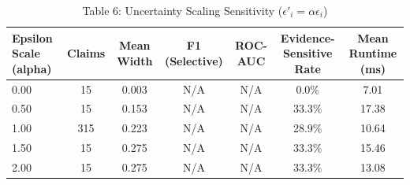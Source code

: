 \begin{table}[htbp]
\centering
\caption{Table 6: Uncertainty Scaling Sensitivity ($\epsilon'_i = \alpha \epsilon_i$)}
\label{tab:table6_epsilon_sensitivity}
\begin{tabular}{lcccccc}
\hline
Epsilon Scale (alpha) & Claims & Mean Width & F1 (Selective) & ROC-AUC & Evidence-Sensitive Rate & Mean Runtime (ms) \\
\hline
0.00 & 15 & 0.003 & N/A & N/A & 0.0\% & 7.01 \\
0.50 & 15 & 0.153 & N/A & N/A & 33.3\% & 17.38 \\
1.00 & 315 & 0.223 & N/A & N/A & 28.9\% & 10.64 \\
1.50 & 15 & 0.275 & N/A & N/A & 33.3\% & 15.46 \\
2.00 & 15 & 0.275 & N/A & N/A & 33.3\% & 13.08 \\
\hline
\end{tabular}
\end{table}